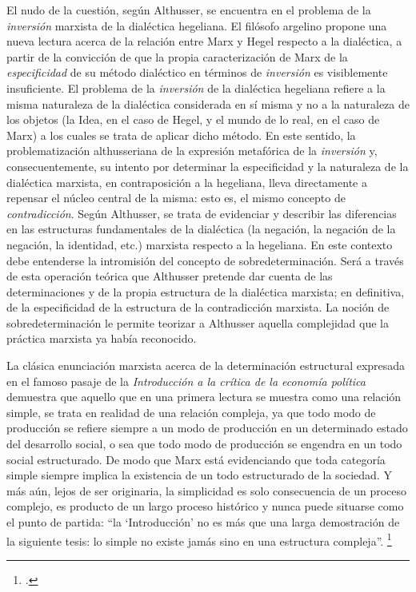 El nudo de la cuestión, según Althusser, se encuentra en el problema de la \emph{inversión} marxista de la dialéctica hegeliana. El filósofo argelino propone una nueva lectura acerca de la relación entre Marx y Hegel respecto a la dialéctica, a partir de la convicción de que la propia caracterización de Marx de la \emph{especificidad} de su método dialéctico en términos de \emph{inversión} es visiblemente insuficiente. El problema de la \emph{inversión} de la dialéctica hegeliana refiere a la misma naturaleza de la dialéctica considerada en sí misma y no  a la naturaleza de los objetos (la Idea, en el caso de Hegel, y el mundo de lo real, en el caso de Marx) a los cuales se trata de aplicar dicho método. En este sentido, la problematización althusseriana de la expresión metafórica de la \emph{inversión} y, consecuentemente, su intento por determinar la especificidad y la naturaleza de la dialéctica marxista, en contraposición a la hegeliana, lleva directamente a repensar el núcleo central de la misma: esto es, el mismo concepto de \emph{contradicción}. Según Althusser, se trata de evidenciar y describir las diferencias en las estructuras fundamentales de la dialéctica (la negación, la negación de la negación, la identidad, etc.) marxista respecto a la hegeliana. En este contexto debe entenderse la intromisión del concepto de sobredeterminación. Será a través de esta operación teórica que Althusser pretende dar cuenta de las determinaciones y de la propia estructura de la dialéctica marxista; en definitiva, de la especificidad de la estructura de la contradicción marxista. La noción de sobredeterminación le permite teorizar a Althusser aquella complejidad que la práctica marxista ya había reconocido.

La clásica enunciación marxista acerca de la determinación estructural expresada en el famoso pasaje de la \emph{Introducción a la crítica de la economía política} demuestra que aquello que en una primera lectura se muestra como una relación simple,  se trata en realidad de una relación compleja, ya que todo modo de producción se refiere siempre a un modo de producción en un determinado estado del desarrollo social, o sea que todo modo de producción se engendra en un todo social estructurado. De modo que Marx está evidenciando que toda categoría simple siempre implica la existencia de un todo estructurado de la sociedad. Y más aún, lejos de ser originaria, la simplicidad es solo consecuencia de un proceso complejo, es producto de un largo proceso histórico y nunca puede situarse como el punto de partida: \enquote{la \enquote{Introducción} no es más que una larga demostración de la siguiente tesis: lo simple no existe jamás sino en una estructura compleja}. \footcite[][162]{@7051-ALTHUSSER1965}

